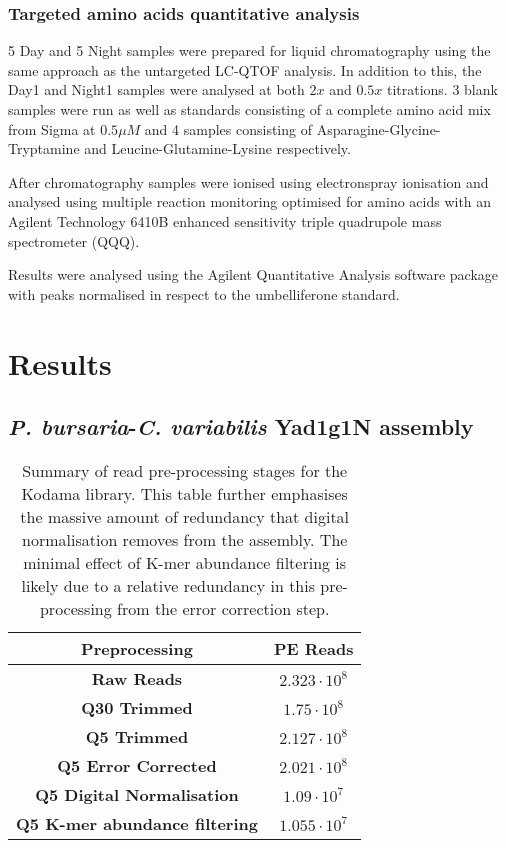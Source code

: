 \subsubsection{Targeted amino acids quantitative analysis}

5 Day and 5 Night samples were prepared for liquid chromatography
using the same approach as the untargeted LC-QTOF analysis.
In addition to this, the Day1 and Night1 samples were analysed at both
\(2x\) and \(0.5x\) titrations.  3 blank samples were run 
as well as standards consisting of a complete amino acid
mix from Sigma at \(0.5\mu M\) and 4 samples consisting of Asparagine-Glycine-Tryptamine
and Leucine-Glutamine-Lysine respectively.

After chromatography samples were ionised using electronspray ionisation
and analysed using multiple reaction monitoring optimised
for amino acids with an Agilent Technology
6410B enhanced sensitivity triple quadrupole mass spectrometer (QQQ).

Results were analysed using the Agilent Quantitative Analysis software package
with peaks normalised in respect to the umbelliferone standard. 

\section{Results}

\subsection{\textit{P. bursaria}-\textit{C. variabilis} Yad1g1N assembly}

\begin{table}
    \centering
    \begin{tabular}{|c|c|}
        \hline
        \textbf{Preprocessing} & \textbf{PE Reads} \\
        \hline
        \textbf{Raw Reads}  & \(2.323\cdot10^{8}\)\\
        \textbf{Q30 Trimmed} & \(1.75\cdot10^{8}\)\\
        \textbf{Q5 Trimmed}  & \(2.127\cdot10^{8} \) \\
        \textbf{Q5 Error Corrected}  & \(2.021\cdot10^{8}\)\\
        \textbf{Q5 Digital Normalisation} & \(1.09 \cdot10^{7}\)\\ 
        \textbf{Q5 K-mer abundance filtering} & \(1.055\cdot10^{7}\)\\
        \hline
    \end{tabular}
    \caption[Results of various types of pre-processing for the Yad1g1N transcriptome]{
        Summary of read pre-processing stages for the Kodama library.  This
        table further emphasises the massive amount of redundancy that digital normalisation 
        removes from the assembly. The minimal effect of K-mer abundance filtering
        is likely due to a relative redundancy in this pre-processing from the error
    correction step.}
    \label{tab:kodama_preproc}
\end{table}

